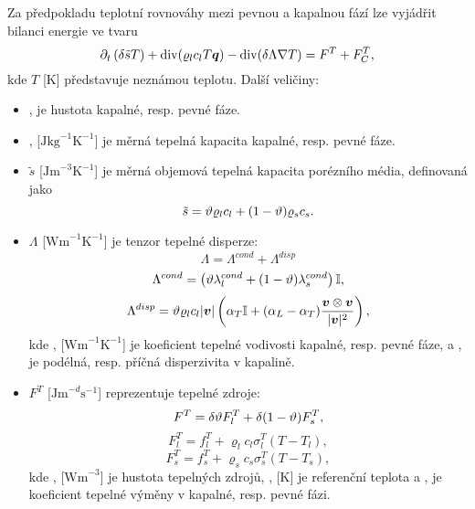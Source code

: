 
Za předpokladu teplotní rovnováhy mezi pevnou a kapalnou fází lze vyjádřit bilanci energie ve tvaru
\[
    \partial_t\left(\delta \tilde s T \right) + \div(\varrho_l c_l T \vc q) - \div(\delta\Lambda\nabla T) = F^T + F^T_C,
\]
kde $T$ [$\mathrm{K}$] představuje neznámou teplotu.
Další veličiny:
\begin{itemize}
\item {},   je hustota kapalné, resp. pevné fáze.
\item {},  [$\mathrm{J}\mathrm{kg}^{-1}\mathrm{K}^{-1}$] je měrná tepelná kapacita kapalné, resp. pevné fáze.
\item $\tilde s$ [$\mathrm{Jm}^{-3}\mathrm{K}^{-1}$] je měrná objemová tepelná kapacita porézního média, definovaná jako
\[ \tilde s = \hyperA{HeatTransfer-DG-Data::porosity}{\th}\varrho_l c_l + (1-\th)\varrho_s c_s. \]
\item $\Lambda$ [$\mathrm{Wm}^{-1}\mathrm{K}^{-1}$] je tenzor tepelné disperze:
\[ \Lambda = \Lambda^{cond} + \Lambda^{disp} \]
\[ \Lambda^{cond} = \left(\th \lambda_l^{cond} + (1-\th)\lambda_s^{cond}\right)\tn I, \]
\[ \Lambda^{disp} = \th \varrho_l c_l|\vc v|\left(\alpha_T\tn I + (\alpha_L-\alpha_T)\frac{\vc v\otimes\vc v}{|\vc v|^2}\right), \]
kde ,  [$\mathrm{Wm}^{-1}\mathrm{K}^{-1}$] je koeficient tepelné vodivosti kapalné, resp. pevné fáze, a ,   je podélná, resp. příčná disperzivita v kapalině.

\item $F^T$ [$\mathrm{Jm}^{-d}\mathrm{s}^{-1}$] reprezentuje tepelné zdroje:
\[ F^T = \delta \th F^T_l + \delta (1-\th) F^T_s, \]
\[ F^T_l = f_l^T + \varrho_l c_l \sigma^T_l(T-T_l), \]
\[ F^T_s = f_s^T + \varrho_s c_s \sigma^T_s(T-T_s), \]
kde ,  [$\mathrm{Wm}^{-3}$] je hustota tepelných zdrojů, ,  [$\mathrm{K}$] je referenční teplota a ,   je koeficient tepelné výměny v kapalné, resp. pevné fázi.
\end{itemize}



